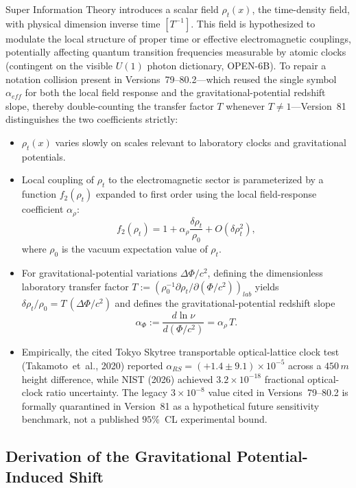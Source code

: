 \documentclass[american,11pt,letterpaper]{article}
\def\mathcal#1{#1}%
\def\mathrm#1{#1}%
\def\texttt#1{#1}%
\def\emph#1{#1}%
\begin{document}
Super Information Theory introduces a scalar field \(\rho_t(x)\), the \emph{time-density field}, with physical dimension inverse time \([T^{-1}]\). This field is hypothesized to modulate the local structure of proper time or effective electromagnetic couplings, potentially affecting quantum transition frequencies measurable by atomic clocks (contingent on the visible \(U(1)\) photon dictionary, \texttt{OPEN-6B}). To repair a notation collision present in Versions~79--80.2---which reused the single symbol \(\alpha_{\mathrm{eff}}\) for both the local field response and the gravitational-potential redshift slope, thereby double-counting the transfer factor \(\mathcal{T}\) whenever \(\mathcal{T} \ne 1\)---Version~81 distinguishes the two coefficients strictly:
\begin{itemize}
    \item \(\rho_t(x)\) varies slowly on scales relevant to laboratory clocks and gravitational potentials.
    \item Local coupling of \(\rho_t\) to the electromagnetic sector is parameterized by a function \(f_2(\rho_t)\) expanded to first order using the \emph{local field-response coefficient} \(\alpha_\rho\):
    \[
    f_2(\rho_t) = 1 + \alpha_\rho \frac{\delta \rho_t}{\rho_0} + \mathcal{O}(\delta \rho_t^2),
    \]
    where \(\rho_0\) is the vacuum expectation value of \(\rho_t\).
    \item For gravitational-potential variations \(\Delta\Phi/c^2\), defining the dimensionless laboratory transfer factor \(\mathcal{T} := (\rho_0^{-1}\partial\rho_t/\partial(\Phi/c^2))_{\mathrm{lab}}\) yields \(\delta\rho_t/\rho_0 = \mathcal{T}\,(\Delta\Phi/c^2)\) and defines the \emph{gravitational-potential redshift slope}
    \[
    \alpha_\Phi := \frac{d\ln\nu}{d(\Phi/c^2)} = \alpha_\rho\,\mathcal{T}.
    \]
    \item Empirically, the cited Tokyo Skytree transportable optical-lattice clock test (Takamoto~\emph{et~al.}, 2020) reported \(\alpha_{\mathrm{RS}} = (+1.4 \pm 9.1)\times 10^{-5}\) across a \(450\,\mathrm{m}\) height difference, while NIST (2026) achieved \(3.2\times 10^{-18}\) fractional optical-clock ratio uncertainty. The legacy \(3\times 10^{-8}\) value cited in Versions~79--80.2 is formally quarantined in Version~81 as a \emph{hypothetical future sensitivity benchmark}, not a published \(95\%\)~CL experimental bound.
\end{itemize}

\subsection{Derivation of the Gravitational Potential-Induced Shift}
\end{document}

